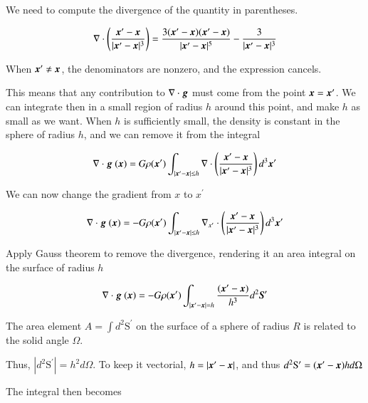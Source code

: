 We need to compute the divergence of the quantity in parentheses. 

\begin{equation}
\nabla \cdot \left( \frac{{\boldsymbol{x}}^\prime - {\boldsymbol{x}}}{|{\boldsymbol{x}}^\prime-{\boldsymbol{x}}|^3} \right) = \frac{3({\boldsymbol{x}}^\prime-{\boldsymbol{x}})({\boldsymbol{x}}^\prime-{\boldsymbol{x}})}{|{\boldsymbol{x}}^\prime-{\boldsymbol{x}}|^5} - \frac{3}{|{\boldsymbol{x}}^\prime-{\boldsymbol{x}}|^3}
\end{equation}

When ${\boldsymbol{x}}^\prime\neq {\boldsymbol{x}}$, the denominators are nonzero, and the expression cancels. 

This means that any contribution to $\nabla\cdot {\boldsymbol{g}}$ must come from the point ${\boldsymbol{x}}={\boldsymbol{x}}^\prime$. We can integrate then in a small region of radius $h$ around this point, and make $h$ as small as we want. When $h$ is sufficiently small, the density is constant in the sphere of radius $h$, and we can remove it from the integral

\begin{equation}
\nabla \cdot {\boldsymbol{g}}\ ({\boldsymbol{x}}) =  G \rho({\boldsymbol{x}}^\prime)\int_{|{\boldsymbol{x}}^\prime-{\boldsymbol{x}}|\leq h}   \nabla \cdot \left( \frac{{\boldsymbol{x}}^\prime - {\boldsymbol{x}}}{|{\boldsymbol{x}}^\prime-{\boldsymbol{x}}|^3} \right) d^3{\boldsymbol{x}}^\prime
\end{equation}

We can now change the gradient from $x$ to $x^\prime$

\begin{equation}
\nabla \cdot {\boldsymbol{g}}\ ({\boldsymbol{x}}) =  - G \rho({\boldsymbol{x}}^\prime)\int_{|{\boldsymbol{x}}^\prime-{\boldsymbol{x}}|\leq h}   \nabla_{x^\prime} \cdot \left( \frac{{\boldsymbol{x}}^\prime - {\boldsymbol{x}}}{|{\boldsymbol{x}}^\prime-{\boldsymbol{x}}|^3} \right) d^3{\boldsymbol{x}}^\prime
\end{equation}

Apply Gauss theorem to remove the divergence, rendering it an area integral on the surface of radius $h$

\begin{equation}
\nabla \cdot {\boldsymbol{g}}\ ({\boldsymbol{x}}) =  -G \rho({\boldsymbol{x}}^\prime)\int_{|{\boldsymbol{x}}^\prime-{\boldsymbol{x}}|= h} \frac{({\boldsymbol{x}}^\prime - {\boldsymbol{x}})}{h^3} d^2{\boldsymbol{S}}^\prime
\end{equation}

The area element $A=\int d^2\mathrm{S}^\prime$ on the surface of a sphere of radius $R$ is related to the solid angle $\Omega$.

Thus, $|d^2\mathrm{S}^\prime| = h^2 d\Omega$. To keep it vectorial, $h = |{\boldsymbol{x}}^\prime-{\boldsymbol{x}}|$, and thus  $d^2\mathrm{S}^\prime = ({\boldsymbol{x}}^\prime-{\boldsymbol{x}})h d\Omega$

The integral then becomes 

